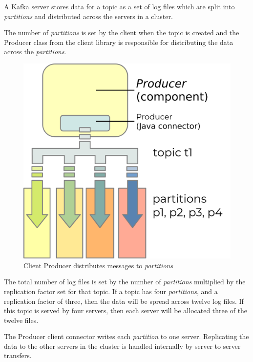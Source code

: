 \documentclass{article}
\newcommand{\kafka} {Kafka\xspace}
\newcommand{\kfpartition} {\textit{partition}\xspace}
\newcommand{\kfpartitions} {\textit{partitions}\xspace}
\newcommand{\javaname}[1] {{\ttfamily\color{codeblue} #1}}
\begin{document}
A \kafka server stores data for a topic as a set of log files which are split into \kfpartitions and distributed across the servers in a cluster.

The number of \kfpartitions is set by the client when the topic is created and the \javaname{Producer} class from the client library is responsible for distributing the data across the \kfpartitions.

\begin{figure}[H]
\begin{center}
\includegraphics{images/kafka-partitions-01.png}
%
\caption{Client \javaname{Producer} distributes messages to \kfpartitions}
\label{fig:kafka-partitions-01}
\end{center}
\end{figure}

\clearpage
The total number of log files is set by the number of \kfpartitions multiplied by the replication factor set for that topic.
If a topic has four \kfpartitions, and a replication factor of three, then the data will be spread across twelve log files.
If this topic is served by four servers, then each server will be allocated three of the twelve files.

The \javaname{Producer} client connector writes each \kfpartition to one server. Replicating the data to the other servers in the cluster is handled internally by server to server transfers.
\end{document}
